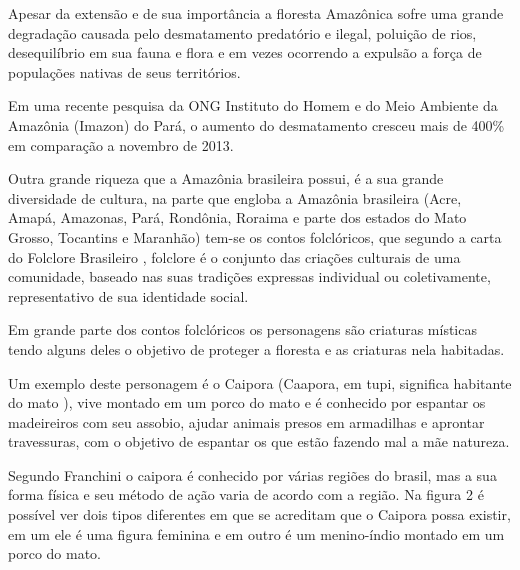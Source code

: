 Apesar da extensão e de sua importância a floresta Amazônica sofre uma grande degradação causada pelo desmatamento predatório e ilegal, poluição de rios, desequilíbrio em sua fauna e flora e em vezes ocorrendo a expulsão a força de populações nativas de seus territórios.

Em uma recente pesquisa da ONG Instituto do Homem e do Meio Ambiente da Amazônia (Imazon) do Pará, o aumento do desmatamento cresceu mais de 400\% em comparação a novembro de 2013. \cite{des}

Outra grande riqueza que a Amazônia brasileira possui, é a sua grande diversidade de cultura, na parte que engloba a Amazônia brasileira (Acre, Amapá, Amazonas, Pará, Rondônia, Roraima e parte dos estados do Mato Grosso, Tocantins e Maranhão) tem-se os contos folclóricos, que segundo a carta do Folclore Brasileiro \cite{fc}, folclore é o conjunto das criações culturais de uma comunidade, baseado nas suas tradições expressas individual ou coletivamente, representativo de sua identidade social.

Em grande parte dos contos folclóricos os personagens são criaturas místicas tendo alguns deles o objetivo de proteger a floresta e as criaturas nela habitadas.


Um exemplo deste personagem é o Caipora (Caapora, em tupi, significa habitante do mato \cite{sig}), vive montado em um porco do mato e é conhecido por espantar os madeireiros com seu assobio, ajudar animais presos em armadilhas e aprontar travessuras, com o objetivo de espantar os que estão fazendo mal a mãe natureza. 

Segundo Franchini o caipora é conhecido por várias regiões do brasil, mas a sua forma física e seu método de ação varia de acordo com a região.
Na figura 2 é possível ver dois tipos diferentes em que se acreditam que o Caipora possa existir, em um ele é uma figura feminina e em outro é um menino-índio montado em um porco do mato. \cite{100}

\begin{figure}[h!]
		\centering
	\end{figure}